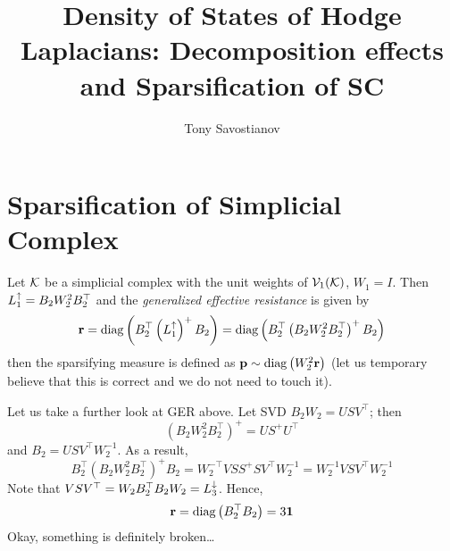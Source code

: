\documentclass{mynotes}
\title{Density of States of Hodge Laplacians: Decomposition effects and Sparsification of SC}
\author[1]{ Tony Savostianov }
\affil[1]{ RWTH, Aachen   \\ email: \email{a.s.savostyanov@gmail.com} }
\begin{document}
\maketitle


\chapter{Sparsification of Simplicial Complex}

Let \( \mathcal{K} \) be a simplicial complex with the unit weights of \( \mathcal{V}_{1}(\mathcal{K}) \), \( W_1 = I \). Then \( L_{1}^{\uparrow} = B_2 W_2^2 B_2^\top \) and the \emph{generalized effective resistance} is given by 
\begin{equation}
      \mathbf{r} = \operatorname{diag} \left( B_2^\top \left( L_{1}^{\uparrow} \right)^+ B_2 \right) = \operatorname{diag} \left( B_2^\top \left( B_2 W_2^2 B_2^\top \right)^+ B_2 \right)
\end{equation}
then the sparsifying measure is defined as \( \mathbf{p} \sim \operatorname{diag} \left( W_2^2 \mathbf{r}  \right)\) (let us temporary believe that this is correct and we do not need to touch it).

\begin{remark}
      Let us take a further look at GER above. Let SVD 
      \( B_2 W_2 = U S V^\top\); then 
      \begin{equation}
            \left( B_2 W_2^2 B_2^\top \right)^+ = U S^+ U^\top 
      \end{equation}
      and \( B_2 = U S V^\top W_2^{-1} \). As a result, 
      \begin{equation}
            B_2^\top \left( B_2 W_2^2 B_2^\top \right)^+ B_2 = W_2^{-\top} V S S^+ S V^\top W_2^{-1} = W_2^{-1} V S V^\top W_2^{-1} 
      \end{equation}
      Note that \( V S V^\top = W_2 B_2^\top B_2 W_2 = L_{3}^{\downarrow} \). Hence,
      \begin{equation}
            \mathbf{r} = \operatorname{diag} \left( B_2^\top B_2 \right) = 3 \mathbf{1}
      \end{equation}
      Okay, something is definitely broken\dots
\end{remark}





\clearpage
\nocite{*}


\end{document}
